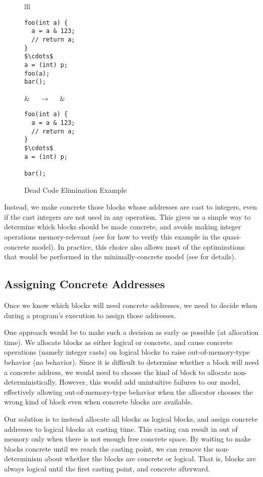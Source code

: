 \begin{figure}[t]
\center
\begin{tabular}{lll}
\begin{lstlisting}
foo(int a) {
  a = a & 123;
  // return a;
}
$\cdots$
a = (int) p;
foo(a);
bar();
\end{lstlisting}
&
$\quad\rightarrow\quad$
&
\begin{lstlisting}
foo(int a) {
  a = a & 123;
  // return a;
}
$\cdots$
a = (int) p;

bar();
\end{lstlisting}
\end{tabular}
\caption{Dead Code Elimination Example}\label{code:dce}
\end{figure}

Instead, we make concrete those blocks whose addresses are cast to integers, 
even if the cast integers are not used in any operation. This gives us a simple way to determine which blocks should be made concrete, and avoids making integer operations memory-relevant 
(see  for how to verify this example in the
quasi-concrete model). In practice, this choice also allows most of the optimizations that would be performed in the minimally-concrete model (see  for details).

\subsection{Assigning Concrete Addresses}
\label{idea:ownership}

Once we know which blocks will need concrete addresses, we need to
decide when during a program's execution to assign those addresses.

One approach would be to make such a decision as early as possible
(\ie at allocation time). We allocate blocks as either logical or
concrete, and cause concrete operations (namely integer casts) on
logical blocks to raise out-of-memory-type behavior (\ie no behavior).
Since it is difficult to determine whether a block will need a
concrete address,
we would need to choose the kind of block to allocate
non-deterministically. However, this would add unintuitive failures to
our model, effectively allowing out-of-memory-type behavior when the
allocator chooses the wrong kind of block even when concrete blocks
are available.

Our solution is to instead allocate all blocks as logical blocks, and assign concrete addresses to logical blocks at casting time. This casting can result in out of memory only when there is not enough free concrete space. By waiting to make blocks concrete until we reach the casting point,
we can remove the non-determinism about whether the blocks are
concrete or logical. That is, blocks are always logical until the
first casting point, and concrete afterward.


